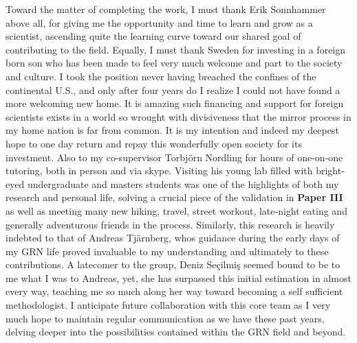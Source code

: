 Toward the matter of completing the work, I must thank Erik Sonnhammer above all, for giving me the opportunity and time to learn and grow as a scientist, ascending quite the learning curve toward our shared goal of contributing to the field. Equally, I must thank Sweden for investing in a foreign born son who has been made to feel very much welcome and part to the society and culture. I took the position never having breached the confines of the continental U.S., and only after four years do I realize I could not have found a more welcoming new home. It is amazing such financing and support for foreign scientists exists in a world so wrought with divisiveness that the mirror process in my home nation is far from common. It is my intention and indeed my deepest hope to one day return and repay this wonderfully open society for its investment. Also to my co-supervisor Torbj{\"o}rn Nordling for hours of one-on-one tutoring, both in person and via skype. Visiting his young lab filled with bright-eyed undergraduate and masters students was one of the highlights of both my research and personal life, solving a crucial piece of the validation in \textbf{Paper III} as well as meeting many new hiking, travel, street workout, late-night eating and generally adventurous friends in the process. Similarly, this research is heavily indebted to that of Andreas Tj{\"a}rnberg, whos guidance during the early days of my GRN life proved invaluable to my understanding and ultimately to these contributions. A latecomer to the group, Deniz Seçilmiş seemed bound to be to me what I was to Andreas, yet, she has surpassed this initial estimation in almost every way, teaching me so much along her way toward becoming a self sufficient methodologist. I anticipate future collaboration with this core team as I very much hope to maintain regular communication as we have these past years, delving deeper into the possibilities contained within the GRN field and beyond.
